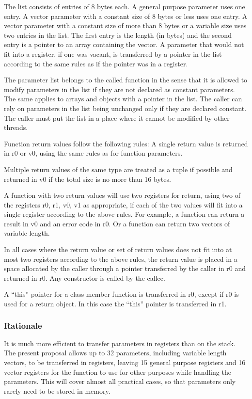 \documentclass[forwardcom.tex]{subfiles}
\begin{document}
The list consists of entries of 8 bytes each. A general purpose parameter uses one entry. A vector parameter with a constant size of 8 bytes or less uses one entry. A vector parameter with a constant size of more than 8 bytes or a variable size uses two entries in the list. The first entry is the length (in bytes) and the second entry is a pointer to an array containing the vector. A parameter that would not fit into a register, if one was vacant, is transferred by a pointer in the list according to the same rules as if the pointer was in a register. 
\vv

The parameter list belongs to the called function in the sense that it is allowed to modify parameters in the list if they are not declared as constant parameters. The same applies to arrays and objects with a pointer in the list. The caller can rely on parameters in the list being unchanged only if they are declared constant. The caller must put the list in a place where it cannot be modified by other threads. 
\vv

Function return values follow the following rules:
A single return value is returned in r0 or v0, using the same rules as for function parameters.
\vv

Multiple return values of the same type are treated as a tuple if possible and returned in v0 if the total size is no more than 16 bytes.
\vv

A function with two return values will use two registers for return, using two of the registers r0, r1, v0, v1 as appropriate, if each of the two values will fit into a single register according to the above rules. For example, a function can return a result in v0 and an error code in r0. Or a function can return two vectors of variable length.
\vv

In all cases where the return value or set of return values does not fit into at most two registers according to the above rules, the return value is placed in a space allocated by the caller through a pointer transferred by the caller in r0 and returned in r0. Any constructor is called by the callee. 
\vv

A ``this'' pointer for a class member function is transferred in r0, except if r0 is used for a return object. In this case the ``this'' pointer is transferred in r1. 


\subsubsection{Rationale}
It is much more efficient to transfer parameters in registers than on the stack. The present proposal allows up to 32 parameters, including variable length vectors, to be transferred in registers, leaving 15 general purpose registers and 16 vector registers for the function to use for other purposes while handling the parameters. This will cover almost all practical cases, so that parameters only rarely need to be stored in memory. 
\vv
\end{document}
